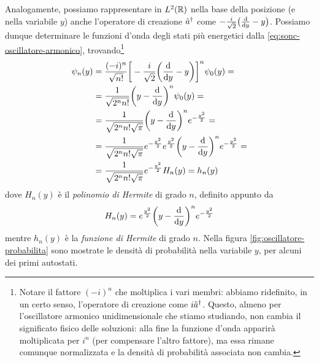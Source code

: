 Analogamente, possiamo rappresentare in $\leb[2]{\R}$ nella base della posizione (e nella variabile $y$) anche l'operatore di creazione $\adj{\op a}$ come $-\frac{i}{\sqrt{2}}\big(\drv{}{y}-y\big)$.
Possiamo dunque determinare le funzioni d'onda degli stati più energetici dalla \eqref{eq:sonc-oscillatore-armonico}, trovando\footnote{Notare il fattore $(-i)^n$ che moltiplica i vari membri: abbiamo ridefinito, in un certo senso, l'operatore di creazione come $i\adj{\op a}$. Questo, almeno per l'oscillatore armonico unidimensionale che stiamo studiando, non cambia il significato fisico delle soluzioni: alla fine la funzione d'onda apparirà moltiplicata per $i^n$ (per compensare l'altro fattore), ma essa rimane comunque normalizzata e la densità di probabilità associata non cambia.}
\begin{equation}
	\begin{split}
		\psi_n(y)&=\frac{(-i)^n}{\sqrt{n!}}\bigg[-\frac{i}{\sqrt{2}}\bigg(\drv{}{y}-y\bigg)\bigg]^n\psi_0(y)=\\
		&=\frac1{\sqrt{2^nn!}}\bigg(y-\drv{}{y}\bigg)^n\psi_0(y)=\\
		&=\frac1{\sqrt{2^nn!\sqrt{\pi}}}\bigg(y-\drv{}{y}\bigg)^ne^{-\frac{y^2}2}=\\
		&=\frac1{\sqrt{2^nn!\sqrt{\pi}}}e^{-\frac{y^2}2}e^{\frac{y^2}2}\bigg(y-\drv{}{y}\bigg)^ne^{-\frac{y^2}2}=\\
		&=\frac1{\sqrt{2^nn!\sqrt{\pi}}}e^{-\frac{y^2}2}H_n(y)=h_n(y)
	\end{split}
	\label{eq:autofunzioni-oscillatore-hermite}
\end{equation}
dove $H_n(y)$ è il \emph{polinomio di Hermite} di grado $n$, definito appunto da
\begin{equation}
	H_n(y)=e^{\frac{y^2}2}\bigg(y-\drv{}{y}\bigg)^ne^{-\frac{y^2}2}
	\label{eq:def-polinomio-hermite}
\end{equation}
mentre $h_n(y)$ è la \emph{funzione di Hermite} di grado $n$.
Nella figura \ref{fig:oscillatore-probabilita} sono mostrate le densità di probabilità nella variabile $y$, per alcuni dei primi autostati.


